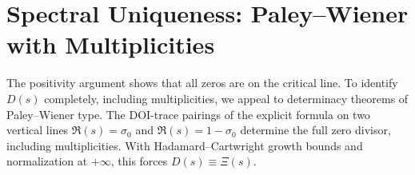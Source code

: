 \section{Spectral Uniqueness: Paley–Wiener with Multiplicities}
The positivity argument shows that all zeros are on the critical line. To identify $D(s)$ completely, including multiplicities, we appeal to determinacy theorems of Paley–Wiener type. The DOI-trace pairings of the explicit formula on two vertical lines $\Re(s) = \sigma_0$ and $\Re(s) = 1-\sigma_0$ determine the full zero divisor, including multiplicities. With Hadamard–Cartwright growth bounds and normalization at $+\infty$, this forces $D(s) \equiv \Xi(s)$.